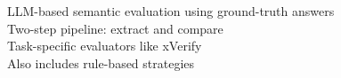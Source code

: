 \documentclass[preview]{standalone}
\begin{document}
LLM-based semantic evaluation using ground-truth answers\\Two-step pipeline: extract and compare\\Task-specific evaluators like xVerify\\Also includes rule-based strategies\\
\end{document}
